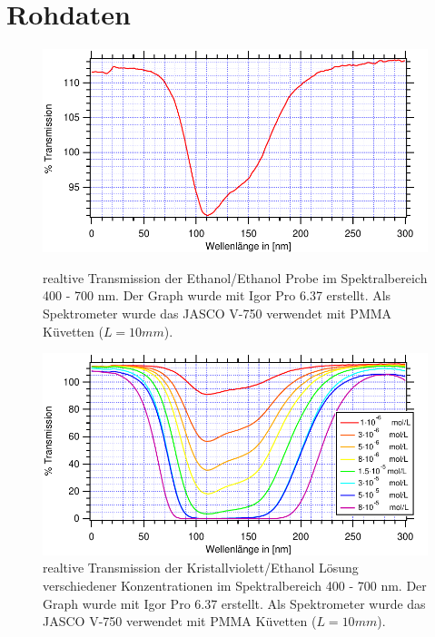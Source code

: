 %
%

\newpage
\section{Rohdaten}


\marginsize{2.5cm}{2.5cm}{2.5cm}{2.5cm}
\begin{figure}[H]
	\centering	
	\begin{minipage}{1\textwidth}
	\includegraphics[width=\columnwidth]{Rohdaten/Graph0.pdf}
	\caption{realtive Transmission der Ethanol/Ethanol Probe im Spektralbereich 400 - 700 nm. Der Graph wurde mit Igor Pro 6.37 erstellt. Als Spektrometer wurde das JASCO V-750 verwendet mit PMMA Küvetten ($L=10 \si{mm}$).} \label{fig:I_Leer}
	\end{minipage}
	\begin{minipage}{1\textwidth}
	\includegraphics[width=\columnwidth]{Rohdaten/alleTransmission.pdf}
	\caption{realtive Transmission der Kristallviolett/Ethanol Lösung verschiedener Konzentrationen im Spektralbereich 400 - 700 nm. Der Graph wurde mit Igor Pro 6.37 erstellt. Als Spektrometer wurde das JASCO V-750 verwendet mit PMMA Küvetten ($L=10 \si{mm}$).}
	\end{minipage}
\end{figure}


